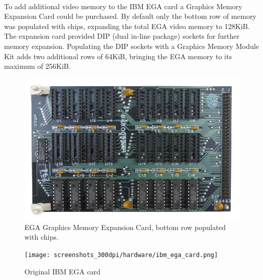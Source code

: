 \documentclass[book.tex]{subfiles}
\begin{document}
\\

\par
To add additional video memory to the IBM EGA card a Graphics Memory Expansion Card could be purchased. By default only the bottom row of memory was populated with chips, expanding the total EGA video memory to 128KiB. The expansion card provided DIP (dual in-line package) sockets for further memory expansion. Populating the DIP sockets with a Graphics Memory Module Kit adds two additional rows of 64KiB, bringing the EGA memory to its maximum of 256KiB. \\


\begin{figure}[H]
  \centering 
  \includegraphics[width=1.0\textwidth]{screenshots_300dpi/hardware/ibm_ega_graphics_memory_expansion_card.png} 
  \caption{EGA Graphics Memory Expansion Card, bottom row populated with chips.}
  \label{fig:ibm_ega_card}
\end{figure}


\begin{figure}[H]
  \centering 
  \texttt{[image: screenshots\_300dpi/hardware/ibm\_ega\_card.png]} 
  \caption{Original IBM EGA card}
  \label{fig:ibm_ega_card}
\end{figure}
\end{document}
